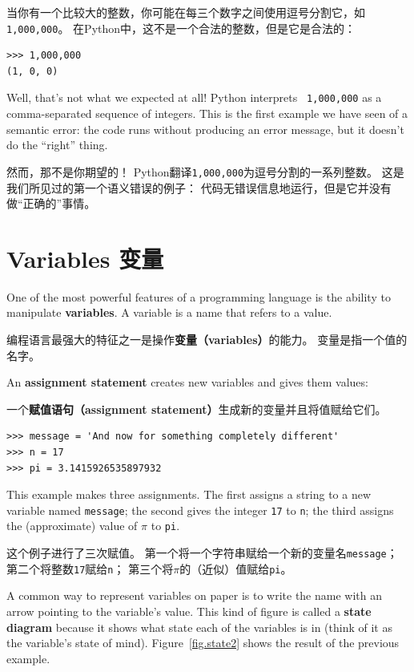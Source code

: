 \documentclass[10pt]{book}
\begin{document}
\begin{CJK}{UTF8}{gbsn}
当你有一个比较大的整数，你可能在每三个数字之间使用逗号分割它，如 {\tt 1,000,000}。
在Python中，这不是一个合法的整数，但是它是合法的：

\begin{verbatim}
>>> 1,000,000
(1, 0, 0)
\end{verbatim}
%
Well, that's not what we expected at all!  Python interprets {\tt
  1,000,000} as a comma-separated sequence of integers.
This is the first example we have seen of a semantic error: the code
runs without producing an error message, but it doesn't do the
``right'' thing.

然而，那不是你期望的！
Python翻译{\tt 1,000,000}为逗号分割的一系列整数。
这是我们所见过的第一个语义错误的例子：
代码无错误信息地运行，但是它并没有做``正确的''事情。

\section{Variables 变量}
\label{variables}

One of the most powerful features of a programming language is the
ability to manipulate {\bf variables}.  A variable is a name that
refers to a value.

编程语言最强大的特征之一是操作{\bf 变量（variables）}的能力。
变量是指一个值的名字。

An {\bf assignment statement} creates new variables and gives
them values:

一个{\bf 赋值语句（assignment statement）}生成新的变量并且将值赋给它们。

\begin{verbatim}
>>> message = 'And now for something completely different'
>>> n = 17
>>> pi = 3.1415926535897932
\end{verbatim}
%
This example makes three assignments.  The first assigns a string
to a new variable named {\tt message};
the second gives the integer {\tt 17} to {\tt n}; the third
assigns the (approximate) value of $\pi$ to {\tt pi}.

这个例子进行了三次赋值。
第一个将一个字符串赋给一个新的变量名{\tt message}；
第二个将整数{\tt 17}赋给{\tt n}；
第三个将$\pi$的（近似）值赋给{\tt pi}。

A common way to represent variables on paper is to write the name with
an arrow pointing to the variable's value.  This kind of figure is
called a {\bf state diagram} because it shows what state each of the
variables is in (think of it as the variable's state of mind).
Figure~\ref{fig.state2} shows the result of the previous example.


\end{CJK}
\end{document}
